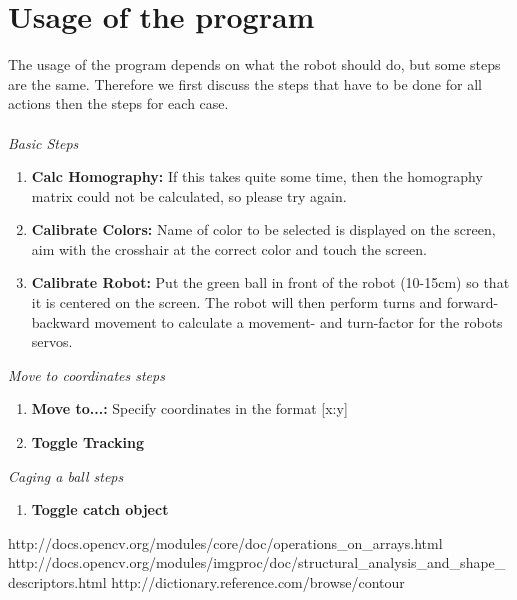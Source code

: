 \documentclass[703031]{iisreport}
\begin{document}
\section{Usage of the program}
\label{sec:usage}
The usage of the program depends on what the robot should do, but some steps are the same. Therefore we first discuss the steps that have to be done for all actions then the steps for each case.\\\\
\emph{Basic Steps}
	\begin{enumerate}
		\item \textbf{Calc Homography:} If this takes quite some time, then the homography matrix could not be calculated, so please try again.
		\item \textbf{Calibrate Colors:} Name of color to be selected is displayed on the screen, aim with the crosshair at the correct color and touch the screen.
		\item \textbf{Calibrate Robot:} Put the green ball in front of the robot (10-15cm) so that it is centered on the screen. The robot will then perform turns and forward-backward movement to calculate a movement- and turn-factor for the robots servos.\\
	\end{enumerate}
\emph{Move to coordinates steps}
	\begin{enumerate}
		\item \textbf{Move to...:} Specify coordinates in the format [x:y]
		\item \textbf{Toggle Tracking}\\
	\end{enumerate}
\emph{Caging a ball steps}
	\begin{enumerate}
		\item \textbf{Toggle catch object}
	\end{enumerate}


\small
\begin{thebibliography}{9}
		http://docs.opencv.org/modules/core/doc/operations\_on\_arrays.html	
		http://docs.opencv.org/modules/imgproc/doc/structural\_analysis\_and\_shape\_descriptors.html
		http://dictionary.reference.com/browse/contour
\end{thebibliography}
\end{document}
